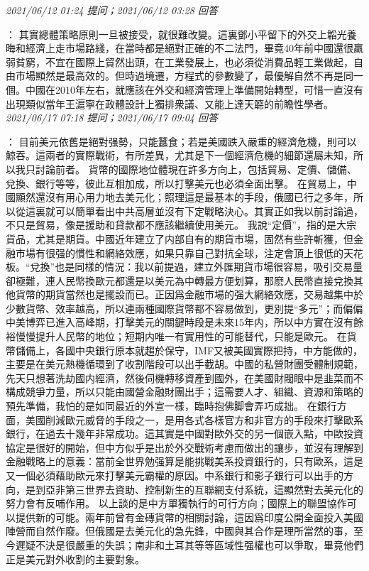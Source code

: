 \documentclass[twocolumn]{ctexart}
\begin{document}
\textit{\hfill\noindent\small 2021/06/12 01:24 提问；2021/06/12 03:28 回答}

：
其實總體策略原則一旦被接受，就很難改變。這裏鄧小平留下的外交上韜光養晦和經濟上走市場路綫，在當時都是絕對正確的不二法門，畢竟40年前中國還很羸弱貧窮，不宜在國際上貿然出頭，在工業發展上，也必須從消費品輕工業做起，自由市場顯然是最高效的。但時過境遷，方程式的參數變了，最優解自然不再是同一個。中國在2010年左右，就應該在外交和經濟管理上準備開始轉型，可惜一直沒有出現類似當年王滬寧在政體設計上獨排衆議、又能上達天聼的前瞻性學者。
\\

\textit{\hfill\noindent\small 2021/06/17 07:18 提问；2021/06/17 09:04 回答}

：
目前美元依舊是絕對强勢，只能蠶食；若是美國跌入嚴重的經濟危機，則可以鯨吞。這兩者的實際戰術，有所差異，尤其是下一個經濟危機的細節還屬未知，所以我只討論前者。
貨幣的國際地位體現在許多方向上，包括貿易、定價、儲備、兌換、銀行等等，彼此互相加成，所以打擊美元也必須全面出擊。
在貿易上，中國顯然還沒有用心用力地去美元化；照理這是最基本的手段，俄國已行之多年，所以從這裏就可以簡單看出中共高層並沒有下定戰略決心。其實正如我以前討論過，不只是貿易，像是援助和貸款都不應該繼續使用美元。
我說“定價”，指的是大宗貨品，尤其是期貨。中國近年建立了内部自有的期貨市場，固然有些許斬獲，但金融市場有很强的慣性和網絡效應，如果只靠自己對抗全球，注定會頂上很低的天花板。“兌換”也是同樣的情況：我以前提過，建立外匯期貨市場很容易，吸引交易量卻極難，連人民幣換歐元都還是以美元為中轉最方便划算，那麽人民幣直接兌換其他貨幣的期貨當然也是擺設而已。正因爲金融市場的强大網絡效應，交易越集中於少數貨幣、效率越高，所以連兩種國際貨幣都不容易做到，更別提“多元”；而偏偏中美博弈已進入高峰期，打擊美元的關鍵時段是未來15年内，所以中方實在沒有餘裕慢慢提升人民幣的地位；短期内唯一有實用性的可能替代，只能是歐元。
在貨幣儲備上，各國中央銀行原本就趨於保守，IMF又被美國實際把持，中方能做的，主要是在美元熱機循環到了收割階段可以出手截胡。中國的私營財團受體制規範，先天只想著洗劫國内經濟，然後伺機轉移資產到國外，在美國財閥眼中是韭菜而不構成競爭力量，所以只能由國營金融財團出手；這需要人才、組織、資源和策略的預先準備，我怕的是如同最近的外宣一樣，臨時抱佛脚會弄巧成拙。
在銀行方面，美國削減歐元威脅的手段之一，是用各式各樣官方和非官方的手段來打擊歐系銀行，在過去十幾年非常成功。這其實是中國對歐外交的另一個嵌入點，中歐投資協定是很好的開始，但中方似乎是出於外交戰術考慮而做出的讓步，並沒有理解到金融戰略上的意義：當前全世界勉强算是能挑戰美系投資銀行的，只有歐系，這是又一個必須藉助歐元來打擊美元霸權的原因。中系銀行和影子銀行可以出手的方向，是到亞非第三世界去資助、控制新生的互聯網支付系統，這顯然對去美元化的努力會有反哺作用。
以上談的是中方單獨執行的可行方向；國際上的聯盟協作可以提供新的可能。兩年前曾有金磚貨幣的相關討論，這因爲印度公開全面投入美國陣營而自然作廢。但俄國是去美元化的急先鋒，中國與其合作是理所當然的事，至今遲疑不決是很嚴重的失誤；南非和土耳其等等區域性强權也可以爭取，畢竟他們正是美元對外收割的主要對象。
\\
\end{document}
